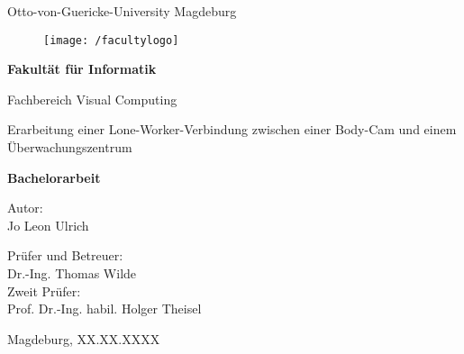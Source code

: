 \documentclass[thesis.tex]{subfiles}
\begin{document}
\thispagestyle {empty}

\begin{center}
\begin{Large}
Otto-von-Guericke-University Magdeburg\\

\begin{figure}
	\centering
	\texttt{[image: /facultylogo]}
	\label{fig:logoinffak}
\end{figure}

\vspace{3mm}

\textbf{Fakultät für Informatik}\\
\end{Large}

\vspace{3mm}

Fachbereich Visual Computing\\

\vspace{1cm}
\begin{Huge}
Erarbeitung einer Lone-Worker-Verbindung zwischen einer Body-Cam und einem Überwachungszentrum\\
\end{Huge}
\vspace{15mm}
{\Huge \textbf{Bachelorarbeit}}\\
\vspace{15mm}

Autor:\\
\vspace{4mm}
{\huge Jo Leon Ulrich}\\

\vspace{16mm}

Prüfer und Betreuer:\\
\vspace{2mm}
{\Large Dr.-Ing. Thomas Wilde}\\
\vspace{4mm}
Zweit Prüfer:\\
\vspace{2mm}
{\Large Prof. Dr.-Ing. habil. Holger Theisel}\\
\vspace{10mm}


\vspace{25mm}

{\large Magdeburg, XX.XX.XXXX}\\

\vspace{40mm}

\end{center}
\clearpage
\end{document}
